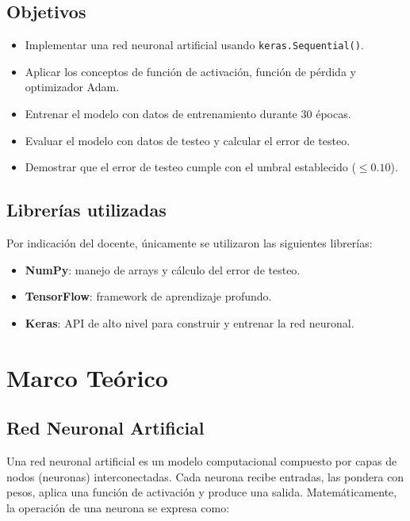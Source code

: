 \documentclass[12pt,a4paper]{article}
\begin{document}
\subsection{Objetivos}
\begin{itemize}
    \item Implementar una red neuronal artificial usando \texttt{keras.Sequential()}.
    \item Aplicar los conceptos de función de activación, función de pérdida y optimizador Adam.
    \item Entrenar el modelo con datos de entrenamiento durante 30 épocas.
    \item Evaluar el modelo con datos de testeo y calcular el error de testeo.
    \item Demostrar que el error de testeo cumple con el umbral establecido ($\leq 0.10$).
\end{itemize}

\subsection{Librerías utilizadas}
Por indicación del docente, únicamente se utilizaron las siguientes librerías:
\begin{itemize}
    \item \textbf{NumPy}: manejo de arrays y cálculo del error de testeo.
    \item \textbf{TensorFlow}: framework de aprendizaje profundo.
    \item \textbf{Keras}: API de alto nivel para construir y entrenar la red neuronal.
\end{itemize}

\section{Marco Teórico}

\subsection{Red Neuronal Artificial}

Una red neuronal artificial es un modelo computacional compuesto por capas de nodos (neuronas) interconectadas. Cada neurona recibe entradas, las pondera con pesos, aplica una función de activación y produce una salida. Matemáticamente, la operación de una neurona se expresa como:
\end{document}
